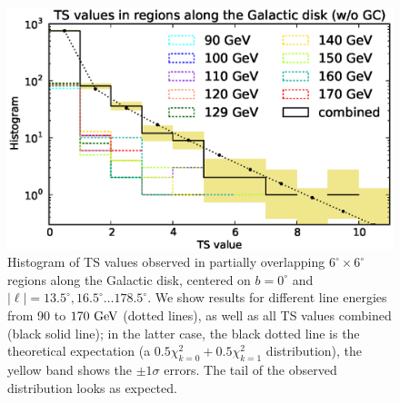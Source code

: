 \documentclass[aps,twocolumn,prd,superscriptaddress,showpacs,nofootinbib,fixfloat]{revtex4}
\newcommand{\GeV}{{\rm ~GeV}}
\begin{document}
\begin{figure}
  \begin{center}
    \includegraphics[width=1.0\linewidth]{plots/hotspot_histogram.eps}
  \end{center}
  \caption{Histogram of TS values observed in partially overlapping
  $6^\circ\times6^\circ$ regions along the Galactic disk, centered on $b=0^\circ$ and
  $|\ell|=13.5^\circ, 16.5^\circ \dots 178.5^\circ$. We show results for
  different line energies from 90 to $170\GeV$ (dotted lines), as well as all
  TS values combined (black solid line); in the latter case, the black dotted
  line is the theoretical expectation (a $0.5\chi^2_{k=0}+0.5\chi^2_{k=1}$
  distribution), the yellow band shows the $\pm1\sigma$ errors. The tail of the
  observed distribution looks as expected.}
  \label{fig:hotspots}
\end{figure}
\end{document}
